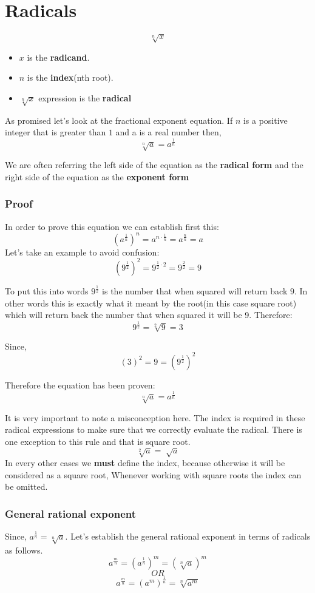 \label{sec:radicals}
\section{Radicals}
$$ \sqrt[n]{x} $$
\begin{itemize}
  \item $x$ is the \textbf{radicand}.
  \item $n$ is the \textbf{index}(nth root).
  \item $ \sqrt[n]{x}$ expression is the \textbf{radical}
\end{itemize}

As promised let's look at the fractional exponent equation. If $n$ is a positive integer that is greater than $1$ and a is a real number then,
$$ \sqrt[n]{a} = a^{\frac{1}{n}} $$

We are often referring the left side of the equation as the \textbf{radical form} and the right side of the equation as the \textbf{exponent form}

\subsubsection{Proof}
In order to prove this equation we can establish first this: 
$$ (a^{\frac{1}{n}})^{n} = a^{n \cdot \frac{1}{n}} = a^{\frac{n}{n}} = a $$
Let's take an example to avoid confusion: 
$$ (9^{\frac{1}{2}})^2 = 9^{\frac{1}{2} \cdot2} = 9^{\frac{2}{2}} = 9 $$

To put this into words $ 9^{\frac{1}{2}} $ is the number that when squared will return back $ 9 $. In other words this is exactly what it meant by the root(in this case square root) which will return back the number that when squared it will be 9. Therefore: 
$$ 9^{\frac{1}{2}} =  \sqrt[2]{9} = 3 $$

Since,
$$ (3)^2 = 9 = (9^{\frac{1}{2}})^2 $$

Therefore the equation has been proven: 
$$ \sqrt[n]{a} = a^{\frac{1}{n}} $$

It is very important to note a misconception here. The index is required in these radical expressions to make sure that we correctly evaluate the radical. There is one exception to this rule and that is square root.
$$ \sqrt[2]{a} = \sqrt[]{a} $$
In every other cases we \textbf{must} define the index, because otherwise it will be considered as a square root, Whenever working with square roots the index can be omitted.

\subsubsection{General rational exponent}
Since, $ a^{\frac{1}{n}} = \sqrt[n]{a} $.
Let's establish the general rational exponent in terms of radicals as follows. 
$$ a^{\frac{m}{n}} = (a^{\frac{1}{n}}) ^{m} = (\sqrt[n]{a})^m $$
$$ OR $$
$$ a^{\frac{m}{n}} = (a^m) ^{\frac{1}{n}} = \sqrt[n]{a^m} $$

